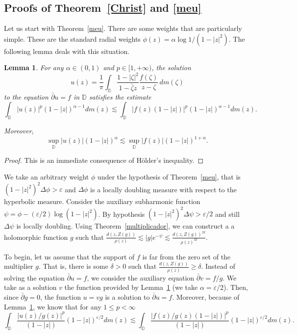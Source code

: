 \documentclass[12pt,twoside,final,psamsfonts]{amsart}
\theoremstyle{plain}
\newtheorem{lema}{Lemma}
\theoremstyle{remark}
\theoremstyle{definition}
\newcommand{\D}{{\mathbb D}}
\newcommand{\dbar}{\bar\partial}
\begin{document}
\subsection{Proofs of Theorem~\ref{Christ} and \ref{meu}}
Let us start with Theorem~\ref{meu}. There are some weights  that are
particularly simple. These are the standard radial weights  $\phi(z)=\alpha\log
1/(1-|z|^2)$. The following lemma deals with this situation.

\begin{lema}\label{pes}
For any $\alpha\in (0,1)$ and $p\in[1,+\infty)$, the solution
\[
u(z)=\frac 1\pi \int_{\D}\frac{1-|\zeta|^2}{1-\bar\zeta
z}\frac{f(\zeta)}{z-\zeta}\, dm(\zeta)
\]
to the equation $\dbar u=f$ in $\D$ satisfies the estimate
\[
\int_\D |u(z)|^p (1-|z|)^{\alpha-1} dm(z)\lesssim
\int_\D |f(z)(1-|z|)|^p (1-|z|)^{\alpha-1} dm(z).
\]

Moreover,
\[
\sup_{\D} |u(z)|(1-|z|)^\alpha\lesssim \sup_{\D} |f(z)|(1-|z|)^{1+\alpha}.
\]
\end{lema}

\begin{proof}
This is an immediate consequence of H\"older's inequality.
\end{proof}

We take an arbitrary weight $\phi$ under the hypothesis of 
Theorem~\ref{meu}, that
is  $(1-|z|^2)^2\Delta \phi>\varepsilon$ and $\Delta\phi$ is a locally
doubling measure with
respect to the hyperbolic measure. Consider the auxiliary subharmonic function
$\psi=\phi - (\varepsilon/2) \log (1-|z|^2)$. By hypothesis 
$(1-|z|^2)^2\Delta \psi>\varepsilon/2$ 
and still $\Delta\psi$ is locally doubling. 
Using Theorem~\ref{multiplicador}, we can construct a
a holomorphic function $g$ such that  
$\frac{d(z,Z(g))}{\rho(z)}\lesssim |g|e^{-\psi}
\lesssim\frac{d(z,Z(g))^M}{\rho(z)^M}$.

To begin, let us assume that the support of $f$ is far from the zero set of the
multiplier $g$. That is, there is some $\delta>0$ such that 
$\frac{d(z,Z(g))}{\rho(z)}\ge\delta$.
Instead of solving the equation $\dbar u =f$, we consider the
auxiliary equation $\dbar v=f/g$. We take as a solution $v$ the function 
provided by Lemma~\ref{pes} (we take $\alpha=\varepsilon/2$). Then,
since $\dbar g=0$, the function $u=v g$ is a solution to $\dbar u =f$.
Moreover, because of Lemma~\ref{pes}, we know that for any $1\le p <\infty$
\[
\int_\D \frac{|u(z)/g(z)|^p}{(1-|z|)}(1-|z|)^{\varepsilon/2} dm(z)\lesssim
\int_\D \frac{|f(z)/g(z)(1-|z|)|^p}{(1-|z|)}(1-|z|)^{\varepsilon/2} dm(z).
\]
\end{document}
